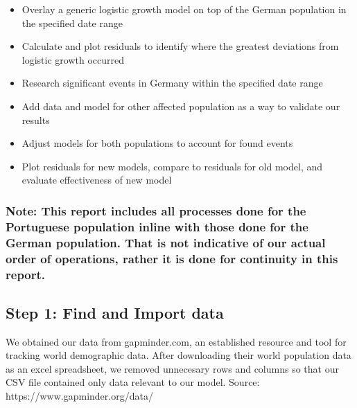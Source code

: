 \documentclass[11pt]{article}
\providecommand{\tightlist}{%
      \setlength{\itemsep}{0pt}\setlength{\parskip}{0pt}}
\begin{document}
\begin{itemize}
\tightlist
\item
  Overlay a generic logistic growth model on top of the German
  population in the specified date range
\item
  Calculate and plot residuals to identify where the greatest deviations
  from logistic growth occurred
\item
  Research significant events in Germany within the specified date range
\item
  Add data and model for other affected population as a way to validate
  our results
\item
  Adjust models for both populations to account for found events
\item
  Plot residuals for new models, compare to residuals for old model, and
  evaluate effectiveness of new model
\end{itemize}

    \hypertarget{note-this-report-includes-all-processes-done-for-the-portuguese-population-inline-with-those-done-for-the-german-population.-that-is-not-indicative-of-our-actual-order-of-operations-rather-it-is-done-for-continuity-in-this-report.}{%
\subsubsection{Note: This report includes all processes done for the
Portuguese population inline with those done for the German population.
That is not indicative of our actual order of operations, rather it is
done for continuity in this
report.}\label{note-this-report-includes-all-processes-done-for-the-portuguese-population-inline-with-those-done-for-the-german-population.-that-is-not-indicative-of-our-actual-order-of-operations-rather-it-is-done-for-continuity-in-this-report.}}

    \hypertarget{step-1-find-and-import-data}{%
\subsection{Step 1: Find and Import
data}\label{step-1-find-and-import-data}}

We obtained our data from gapminder.com, an established resource and
tool for tracking world demographic data. After downloading their world
population data as an excel spreadsheet, we removed unnecesary rows and
columns so that our CSV file contained only data relevant to our model.
Source: https://www.gapminder.org/data/
\end{document}
